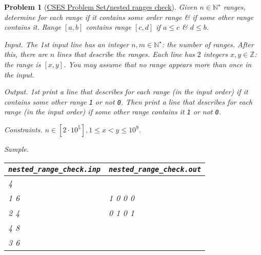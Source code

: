 \documentclass{article}
\newtheorem{problem}{Problem}
\begin{document}
\begin{problem}[\href{https://cses.fi/problemset/task/2168}{CSES Problem Set{\tt/}nested ranges check}]
    Given  $n\in\mathbb{N}^\star$ ranges, determine for each range if it contains some order range \& if some other range contains it. Range $[a,b]$ contains range $[c,d]$ if $a\le c$ \& $d\le b$.
    \item {\sf Input.} The 1st input line has an integer $n,m\in\mathbb{N}^\star$: the number of ranges. After this, there are $n$ lines that describe the ranges. Each line has $2$ integers $x,y\in\mathbb{Z}$: the range is $[x,y]$. You may assume that no range appears more than once in the input.
    \item {\sf Output.} 1st print a line that describes for each range (in the input order) if it contains some other range {\tt1} or not {\tt0}. Then print a line that describes for each range (in the input order) if some other range contains it {\tt1} or not {\tt0}.
    \item {\sf Constraints.} $n\in[2\cdot10^5],1\le x < y\le10^9$.
    \item {\sf Sample.}
    \begin{table}[H]
        \centering
        \begin{tabular}{|l|l|}
            \hline
            \verb|nested_range_check.inp| & \verb|nested_range_check.out| \\
            \hline
            4 & \\
            1 6 & 1 0 0 0 \\
            2 4 & 0 1 0 1 \\
            4 8 & \\
            3 6 & \\
            \hline
        \end{tabular}
    \end{table}
\end{problem}
\end{document}
